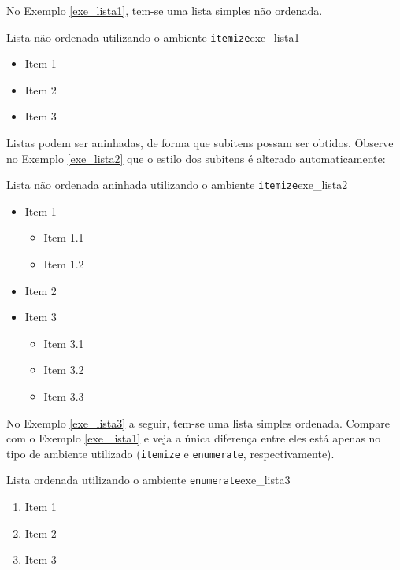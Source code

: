 No Exemplo \ref{exe_lista1}, tem-se uma lista simples não ordenada.

\begin{texexptitled}[breakable,enhanced,middle=2mm]{Lista não ordenada utilizando o ambiente \texttt{itemize}}{exe_lista1}
\begin{itemize}
    \item Item 1
    \item Item 2
    \item Item 3
\end{itemize}
\end{texexptitled}

Listas podem ser aninhadas, de forma que subitens possam ser obtidos. Observe no Exemplo \ref{exe_lista2} que o estilo dos subitens é alterado automaticamente:

\begin{texexptitled}[breakable,enhanced,middle=2mm]{Lista não ordenada aninhada utilizando o ambiente \texttt{itemize}}{exe_lista2}
\begin{itemize}
    \item Item 1
    \begin{itemize}
        \item Item 1.1
        \item Item 1.2
    \end{itemize}
    \item Item 2
    \item Item 3
    \begin{itemize}
        \item Item 3.1
        \item Item 3.2
        \item Item 3.3
    \end{itemize}
\end{itemize}
\end{texexptitled}

No Exemplo \ref{exe_lista3} a seguir, tem-se uma lista simples ordenada. Compare com o Exemplo \ref{exe_lista1} e veja a única diferença entre eles está apenas no tipo de ambiente utilizado ({\tt itemize} e {\tt enumerate}, respectivamente).

\begin{texexptitled}[breakable,enhanced,middle=2mm]{Lista ordenada utilizando o ambiente \texttt{enumerate}}{exe_lista3}
\begin{enumerate}
    \item Item 1
    \item Item 2
    \item Item 3
\end{enumerate}
\end{texexptitled}


